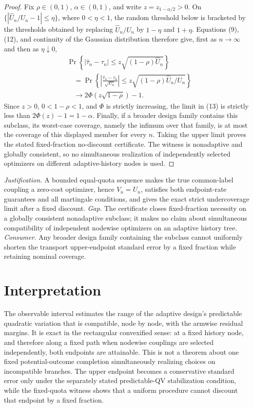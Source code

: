 \documentclass{article}
\begin{document}
\begin{proof}
Fix \(\rho\in(0,1)\), \(\alpha\in(0,1)\), and write \(z=z_{1-\alpha/2}>0\).  On \(\{|\widehat U_n/U_n-1|\le\eta\}\), where \(0<\eta<1\), the random threshold below is bracketed by the thresholds obtained by replacing \(\widehat U_n/U_n\) by \(1-\eta\) and \(1+\eta\).  Equations (9), (12), and continuity of the Gaussian distribution therefore give, first as \(n\to\infty\) and then as \(\eta\downarrow0\),
\[
\begin{aligned}
&\Pr\!\left\{|\widehat\tau_n-\tau_n|
\le z\sqrt{(1-\rho)\widehat U_n}\right\}\\
&\quad=\Pr\!\left\{
\left|\frac{\widehat\tau_n-\tau_n}{\sqrt{U_n}}\right|
\le z\sqrt{(1-\rho)\widehat U_n/U_n}\right\}\\
&\quad\longrightarrow2\Phi\!\left(z\sqrt{1-\rho}\right)-1.
\end{aligned}
\tag{13}
\]
Since \(z>0\), \(0<1-\rho<1\), and \(\Phi\) is strictly increasing, the limit in (13) is strictly less than \(2\Phi(z)-1=1-\alpha\).  Finally, if a broader design family contains this subclass, its worst-case coverage, namely the infimum over that family, is at most the coverage of this displayed member for every \(n\).  Taking the upper limit proves the stated fixed-fraction no-discount certificate.  The witness is nonadaptive and globally consistent, so no simultaneous realization of independently selected optimizers on different adaptive-history nodes is used.
\end{proof}
\par\smallskip\noindent \textit{Justification.} A bounded equal-quota sequence makes the true common-label coupling a zero-cost optimizer, hence \(V_n=U_n\), satisfies both endpoint-rate guarantees and all martingale conditions, and gives the exact strict undercoverage limit after a fixed discount. \textit{Gap.} The certificate closes fixed-fraction necessity on a globally consistent nonadaptive subclass; it makes no claim about simultaneous compatibility of independent nodewise optimizers on an adaptive history tree. \textit{Consumer.} Any broader design family containing the subclass cannot uniformly shorten the transport upper-endpoint standard error by a fixed fraction while retaining nominal coverage.

\section{Interpretation}

The observable interval estimates the range of the adaptive design's predictable quadratic variation that is compatible, node by node, with the armwise residual margins. It is exact in the rectangular convexified sense: at a fixed history node, and therefore along a fixed path when nodewise couplings are selected independently, both endpoints are attainable. This is not a theorem about one fixed potential-outcome completion simultaneously realizing choices on incompatible branches. The upper endpoint becomes a conservative standard error only under the separately stated predictable-QV stabilization condition, while the fixed-quota witness shows that a uniform procedure cannot discount that endpoint by a fixed fraction.
\end{document}
